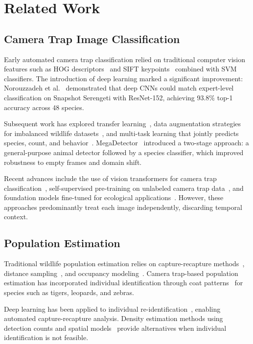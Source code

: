 \section{Related Work}


\subsection{Camera Trap Image Classification}

Early automated camera trap classification relied on traditional computer vision features such as HOG descriptors~\cite{dalal2005} and SIFT keypoints~\cite{lowe2004} combined with SVM classifiers. The introduction of deep learning marked a significant improvement: Norouzzadeh et al.~\cite{norouzzadeh2018} demonstrated that deep CNNs could match expert-level classification on Snapshot Serengeti with ResNet-152, achieving 93.8\% top-1 accuracy across 48 species.

Subsequent work has explored transfer learning~\cite{tabak2019}, data augmentation strategies for imbalanced wildlife datasets~\cite{beery2019}, and multi-task learning that jointly predicts species, count, and behavior~\cite{willi2019}. MegaDetector~\cite{beery2019mega} introduced a two-stage approach: a general-purpose animal detector followed by a species classifier, which improved robustness to empty frames and domain shift.

Recent advances include the use of vision transformers for camera trap classification~\cite{dosovitskiy2021}, self-supervised pre-training on unlabeled camera trap data~\cite{pantazis2021}, and foundation models fine-tuned for ecological applications~\cite{weinstein2022}. However, these approaches predominantly treat each image independently, discarding temporal context.

\subsection{Population Estimation}

Traditional wildlife population estimation relies on capture-recapture methods~\cite{jolly1965, seber1965}, distance sampling~\cite{buckland2001}, and occupancy modeling~\cite{mackenzie2002}. Camera trap-based population estimation has incorporated individual identification through coat patterns~\cite{karanth1998} for species such as tigers, leopards, and zebras.

Deep learning has been applied to individual re-identification~\cite{schneider2020}, enabling automated capture-recapture analysis. Density estimation methods using detection counts and spatial models~\cite{chandler2011} provide alternatives when individual identification is not feasible.

